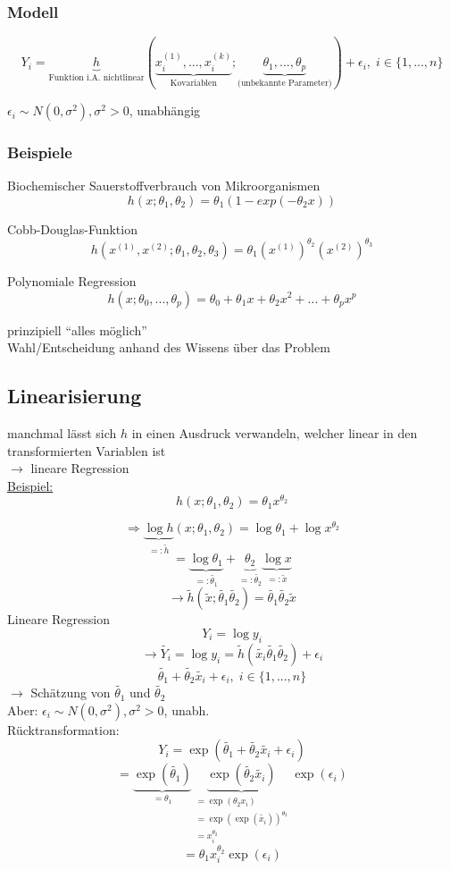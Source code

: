 \documentclass[../VorlesungMaster.tex]{subfiles}
\begin{document}
\subsubsection{Modell}
\[Y_i = \underbrace{h}_{\text{Funktion i.A. nichtlinear}} \left(\underbrace{x_i^{(1)},...,x_i^{(k)}}_{\text{Kovariablen}};
\underbrace{\theta_1,...,\theta_p}_{\text{(unbekannte Parameter)}} \right) + \epsilon_i, \; i \in \{1,...,n\} \]

$\epsilon_i \sim N(0,\sigma^2) , \sigma^2 >0$, unabhängig

\subsubsection{Beispiele}
Biochemischer Sauerstoffverbrauch von Mikroorganismen
\[h(x;\theta_1,\theta_2) = \theta_1(1-exp(-\theta_2 x)) \]

Cobb-Douglas-Funktion
\[h(x^{(1)},x^{(2)}; \theta_1, \theta_2, \theta_3)= \theta_1(x^{(1)})^{\theta_2} (x^{(2)})^{\theta_3} \]

Polynomiale Regression
\[h(x; \theta_0,..., \theta_p)= \theta_0 + \theta_1 x  + \theta_2 x^2 + ... + \theta_p x^p \]

prinzipiell ``alles möglich'' \\

Wahl/Entscheidung anhand des Wissens über das Problem

\subsection{Linearisierung}
manchmal lässt sich $h$ in einen Ausdruck verwandeln, welcher linear in den transformierten Variablen ist \\
$\rightarrow$ lineare Regression \\
\underline{Beispiel:}
\[ h(x; \theta_1, \theta_2) = \theta_1 x^{\theta_2} \]

\[ \Rightarrow \underbrace{\log h}_{=:  \tilde{h}}(x; \theta_1, \theta_2) = \log \theta_1 + \log x^{\theta_2} \]
\[= \underbrace{\log \theta_1}_{=: \tilde{\theta_1}} + \underbrace{\theta_2}_{=: \tilde{\theta_2}} \underbrace{ \log x }_{=: \tilde{x}} \]
\[ \rightarrow \tilde{h}(\tilde{x};\tilde{\theta_1} \tilde{ \theta_2} ) = \tilde{\theta_1} \tilde{\theta_2} \tilde{x} \]
Lineare Regression
\[ Y_i=\log y_i \]
\[ \rightarrow \tilde{Y_i} = \log y_i = \tilde{h}(\tilde{x_i} \tilde{\theta_1} \tilde{ \theta_2}) + \epsilon_i \]
\[ \tilde{\theta_1} + \tilde{\theta_2} \tilde{x_i} + \epsilon_i, \; i \in \{1,...,n\} \]
$\rightarrow$ Schätzung von $\tilde{\theta_1}$ und $\tilde{\theta_2}$ \\
Aber: $\epsilon_i \sim N(0,\sigma^2), \sigma^2 > 0$, unabh.\\
Rücktransformation:
\[ Y_i = \exp(\tilde{\theta_1} + \tilde{\theta_2} \tilde{x_i} + \epsilon_i ) \]
\[ = \underbrace{\exp(\tilde{\theta_1})}_{=\theta_1} \underbrace{\exp(\tilde{\theta_2}\tilde{x_i})}_{
\substack{= \exp(\theta_2 x_i) \\ = \exp ( \exp ( \tilde{x_i} ))^{\theta_2} \\ = x_i^{\theta_2} }}
\exp(\epsilon_i) \]
\[= \theta_1 x_i^{\theta_2} \exp (\epsilon_i) \]
\end{document}
